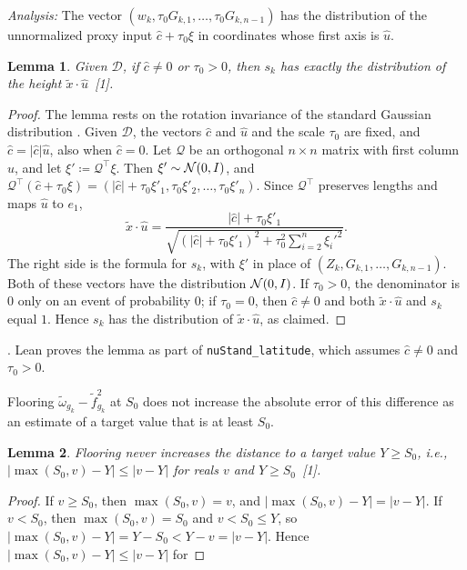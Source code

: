 \documentclass[10pt]{article}
\newcommand{\leanmark}[1]{{\relscale{0.78}\color{gray}[#1]}}
\newenvironment{leanitems}{\par\smallskip\relscale{0.78}\color{gray}\hypersetup{urlcolor=gray}\raggedright%
  \begin{list}{}{\setlength{\leftmargin}{2em}\setlength{\labelwidth}{1.6em}%
  \setlength{\labelsep}{0.4em}\setlength{\itemsep}{0pt}\setlength{\topsep}{0pt}%
  \setlength{\parsep}{0pt}}}{\end{list}\par\medskip}
\newtheorem{lemma}{Lemma}
\newcommand{\Dd}{\mathcal{D}}\newcommand{\Ee}{\mathcal{E}}
\newcommand{\chat}{\hat c}
\begin{document}
\begin{enumerate}[leftmargin=*,itemsep=8pt,topsep=10pt plus 2pt]
  \emph{Analysis:} The vector $(w_k,\tau_0G_{k,1},\dots,\tau_0G_{k,n-1})$ has
  the distribution of the unnormalized proxy input $\chat+\tau_0\xi$ in
  coordinates whose first axis is $\hat u$.
  \begin{lemma}\label{lem:seedheight}
    Given $\Dd$, if $\chat\ne0$ or $\tau_0>0$, then $s_k$ has exactly the
    distribution of the height $\tilde x\cdot\hat u$~\leanmark{1}.
  \end{lemma}
  \begin{proof}
  The lemma rests on the rotation invariance of the standard Gaussian
  distribution \citep[Proposition~3.3.2]{vershynin-2018-hdp}. Given $\Dd$,
  the vectors $\chat$ and $\hat u$ and the scale $\tau_0$ are fixed, and
  $\chat=|\chat|\hat u$, also when $\chat=0$. Let $\mathcal Q$ be an orthogonal
  $n\times n$ matrix with first column $\hat u$, and let
  $\xi'\coloneqq \mathcal Q^\top\xi$. Then $\xi'\sim\mathcal{N}(0,I)$, and
  $\mathcal Q^\top(\chat+\tau_0\xi)=(|\chat|+\tau_0\xi'_1,\tau_0\xi'_2,\dots,\tau_0\xi'_n)$.
  Since $\mathcal Q^\top$ preserves lengths and maps $\hat u$ to $e_1$,
  \[\tilde x\cdot\hat u=\frac{|\chat|+\tau_0\xi'_1}
  {\sqrt{(|\chat|+\tau_0\xi'_1)^2+\tau_0^2\sum_{i=2}^n\xi_i'^2}}.\]
  The right side is the formula for $s_k$, with $\xi'$ in place
  of $(Z_k,G_{k,1},\dots,G_{k,n-1})$. Both of these vectors have the
  distribution $\mathcal{N}(0,I)$. If $\tau_0>0$, the denominator is $0$ only on an
  event of probability $0$; if $\tau_0=0$, then $\chat\ne0$ and both $\tilde x\cdot\hat u$ and $s_k$
  equal $1$. Hence $s_k$ has the distribution of $\tilde x\cdot\hat u$, as
  claimed.
  \end{proof}
  \begin{leanitems}
  . Lean proves the lemma as part of
  \texttt{nuStand\_latitude}, which assumes $\chat\ne0$ and $\tau_0>0$.
  \end{leanitems}
  Flooring $\tilde\omega_{g_k}-\tilde f_{g_k}^2$ at $S_0$ does not increase
  the absolute error of this difference as an estimate of a target value that
  is at least $S_0$.
  \begin{lemma}\label{lem:floor}
    Flooring never increases the distance to a target value $Y\ge S_0$,
    i.e., $|\max(S_0,v)-Y|\le|v-Y|$ for reals $v$ and $Y\ge S_0$~\leanmark{1}.
  \end{lemma}
  \begin{proof}
  If $v\ge S_0$, then $\max(S_0,v)=v$, and $|\max(S_0,v)-Y|=|v-Y|$. If
  $v<S_0$, then $\max(S_0,v)=S_0$ and $v<S_0\le Y$, so
  $|\max(S_0,v)-Y|=Y-S_0<Y-v=|v-Y|$. Hence $|\max(S_0,v)-Y|\le|v-Y|$ for

\end{proof}
\end{enumerate}
\end{document}

